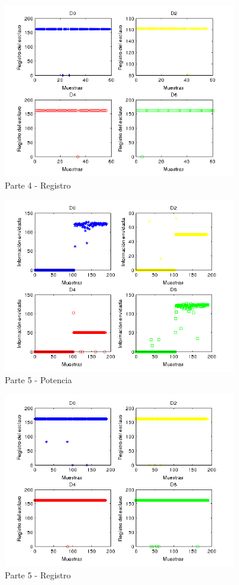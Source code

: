 \documentclass[spanish,12pt,a4paper,titlepage]{report}
\begin{document}
\begin{figure}[h!]
	\centering
	\includegraphics[width=0.9\textwidth]{./Pics/4R}
	\caption{Parte 4 - Registro}
	\label{fig:}
\end{figure}

\begin{figure}[h!]
	\centering
	\includegraphics[width=0.9\textwidth]{./Pics/5P}
	\caption{Parte 5 - Potencia}
	\label{fig:}
\end{figure}

\begin{figure}[h!]
	\centering
	\includegraphics[width=0.9\textwidth]{./Pics/5R}
	\caption{Parte 5 - Registro}
	\label{fig:}
\end{figure}
\end{document}
